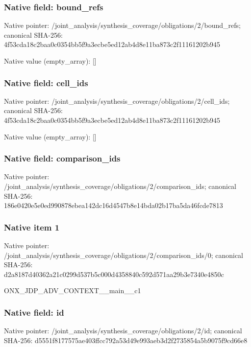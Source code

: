 \documentclass[10pt,a4paper]{article}
\begin{document}
\subsubsection{Native field: bound\_\allowbreak{}refs}
Native pointer: /joint\_\allowbreak{}analysis/synthesis\_\allowbreak{}coverage/obligations/2/bound\_\allowbreak{}refs; canonical SHA-256: 4f53cda18c2baa0c0354bb5f9a3ecbe5ed12ab4d8e11ba873c2f11161202b945

Native value (empty\_\allowbreak{}array): []

\subsubsection{Native field: cell\_\allowbreak{}ids}
Native pointer: /joint\_\allowbreak{}analysis/synthesis\_\allowbreak{}coverage/obligations/2/cell\_\allowbreak{}ids; canonical SHA-256: 4f53cda18c2baa0c0354bb5f9a3ecbe5ed12ab4d8e11ba873c2f11161202b945

Native value (empty\_\allowbreak{}array): []

\subsubsection{Native field: comparison\_\allowbreak{}ids}
Native pointer: /joint\_\allowbreak{}analysis/synthesis\_\allowbreak{}coverage/obligations/2/comparison\_\allowbreak{}ids; canonical SHA-256: 186e0420e5e0ed990878ebea142dc16d4547b8e14bda02b17ba5da46fcde7813

\subsubsection{Native item 1}
Native pointer: /joint\_\allowbreak{}analysis/synthesis\_\allowbreak{}coverage/obligations/2/comparison\_\allowbreak{}ids/0; canonical SHA-256: d2a8187d40362a21c0299d537b5c000d4358840c592d571aa29b3e7340e4850c

\begingroup\raggedright\sloppy ONX\_\allowbreak{}JDP\_\allowbreak{}ADV\_\allowbreak{}CONTEXT\_\allowbreak{}\_\allowbreak{}main\_\allowbreak{}\_\allowbreak{}c1\par\endgroup

\subsubsection{Native field: id}
Native pointer: /joint\_\allowbreak{}analysis/synthesis\_\allowbreak{}coverage/obligations/2/id; canonical SHA-256: d5551f8177575ae403ffcc792a53d49e993aeb3d2f2735854a5b9075f9cd66e8
\end{document}
